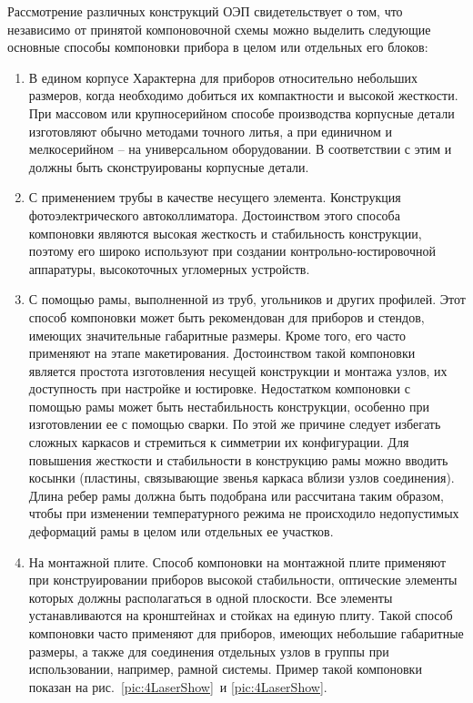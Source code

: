 Рассмотрение различных конструкций ОЭП свидетельствует о том, что независимо от принятой компоновочной схемы можно выделить следующие основные способы компоновки прибора в целом или отдельных его блоков:
\begin{enumerate}
	\item В едином корпусе Характерна для приборов относительно небольших размеров, когда необходимо добиться их компактности и высокой жесткости. При массовом или крупносерийном способе производства корпусные детали изготовляют обычно методами точного литья, а при единичном и мелкосерийном -- на универсальном оборудовании. В соответствии с этим и должны быть сконструированы корпусные детали.
	
	\item С применением трубы в качестве несущего элемента. Конструкция фотоэлектрического автоколлиматора. Достоинством этого способа компоновки являются высокая жесткость и стабильность конструкции, поэтому его широко используют при создании контрольно-юстировочной аппаратуры, высокоточных угломерных устройств.
	
	\item С помощью рамы, выполненной из труб, угольников и других профилей. Этот способ компоновки может быть рекомендован для приборов и стендов, имеющих значительные габаритные размеры. Кроме того, его часто применяют на этапе макетирования. Достоинством такой компоновки является простота изготовления несущей конструкции и монтажа узлов, их доступность при настройке и юстировке. Недостатком компоновки с помощью рамы может быть нестабильность конструкции, особенно при изготовлении ее с помощью сварки. По этой же причине следует избегать сложных каркасов и стремиться к симметрии их конфигурации. Для повышения жесткости и стабильности в конструкцию рамы можно вводить косынки (пластины, связывающие звенья каркаса вблизи узлов соединения). Длина ребер рамы должна быть подобрана или рассчитана таким образом, чтобы при изменении температурного режима не происходило недопустимых деформаций рамы в целом или отдельных ее участков.
	
	\item На монтажной плите. Способ компоновки на монтажной плите применяют при конструировании приборов высокой стабильности, оптические элементы которых должны располагаться в одной плоскости. Все элементы устанавливаются на кронштейнах и стойках на единую плиту. Такой способ компоновки часто применяют для приборов, имеющих небольшие габаритные размеры, а также для соединения отдельных узлов в группы при использовании, например, рамной системы. Пример такой компоновки показан на рис.~\ref{pic:4LaserShow}~и \ref{pic:4LaserShow}.
	

\end{enumerate}

